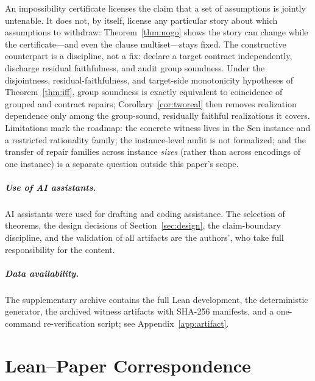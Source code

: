 \documentclass[sigplan,10pt,review,anonymous]{acmart}
\theoremstyle{acmdefinition}
\begin{document}
An impossibility certificate licenses the claim that a set of assumptions is
jointly untenable. It does not, by itself, license any particular story about
which assumptions to withdraw: Theorem~\ref{thm:nogo} shows the story can
change while the certificate---and even the clause multiset---stays fixed.
The constructive counterpart is a discipline, not a fix: declare a target
contract independently, discharge residual faithfulness, and audit group
soundness. Under the disjointness, residual-faithfulness, and target-side
monotonicity hypotheses of Theorem~\ref{thm:iff}, group soundness is exactly
equivalent to coincidence of grouped and contract repairs;
Corollary~\ref{cor:tworeal} then removes realization dependence only among the
group-sound, residually faithful realizations it covers. Limitations mark the
roadmap: the concrete witness lives in
the Sen instance and a restricted rationality family; the instance-level audit
is not formalized; and the transfer of repair families across instance
\emph{sizes} (rather than across encodings of one instance) is a separate
question outside this paper's scope.

\subparagraph*{Use of AI assistants.} AI assistants were used for drafting
and coding assistance. The selection of theorems, the design decisions of
Section~\ref{sec:design}, the claim-boundary discipline, and the validation
of all artifacts are the authors', who take full responsibility for the
content.

\subparagraph*{Data availability.} The supplementary archive contains the
full Lean development, the deterministic generator, the archived witness
artifacts with SHA-256 manifests, and a one-command re-verification script;
see Appendix~\ref{app:artifact}.

\appendix

\section{Lean--Paper Correspondence}
\label{app:lean}
\end{document}
